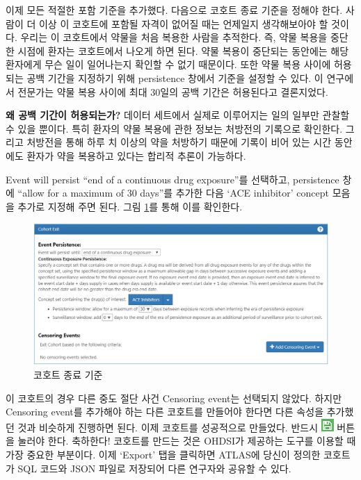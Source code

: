 \documentclass[10.5pt]{book}
\theoremstyle{definition}
\theoremstyle{definition}
\theoremstyle{definition}
\theoremstyle{remark}
\begin{document}
이제 모든 적절한 포함 기준을 추가했다. 다음으로 코호트 종료 기준을
정해야 한다. 사람이 더 이상 이 코호트에 포함될 자격이 없어질 때는
언제일지 생각해보아야 할 것이다. 우리는 이 코호트에서 약물을 처음 복용한
사람을 추적한다. 즉, 약물 복용을 중단한 시점에 환자는 코호트에서 나오게
하면 된다. 약물 복용이 중단되는 동안에는 해당 환자에게 무슨 일이
일어나는지 확인할 수 없기 때문이다. 또한 약물 복용 사이에 허용되는 공백
기간을 지정하기 위해 persistence 창에서 기준을 설정할 수 있다. 이
연구에서 전문가는 약물 복용 사이에 최대 30일의 공백 기간은 허용된다고
결론지었다.

\textbf{왜 공백 기간이 허용되는가?} 데이터 세트에서 실제로 이루어지는
일의 일부만 관찰할 수 있을 뿐이다. 특히 환자의 약물 복용에 관한 정보는
처방전의 기록으로 확인한다. 그리고 처방전을 통해 하루 치 이상의 약을
처방하기 때문에 기록이 비어 있는 시간 동안에도 환자가 약을 복용하고
있다는 합리적 추론이 가능하다.

Event will persist ``end of a continuous drug exposure''를 선택하고,
persistence 창에 ``allow for a maximum of 30 days''를 추가한 다음 `ACE
inhibitor' concept 모음을 추가로 지정해 주면 된다. 그림
\ref{fig:ATLAScohortexit}를 통해 이를 확인한다.

\begin{figure}

{\centering \includegraphics[width=1\linewidth]{images/Cohorts/cohort-exit} 

}

\caption{코호트 종료 기준}\label{fig:ATLAScohortexit}
\end{figure}

이 코호트의 경우 다른 중도 절단 사건 Censoring event는 선택되지 않았다.
하지만 Censoring event를 추가해야 하는 다른 코호트를 만들어야 한다면
다른 속성을 추가했던 것과 비슷하게 진행하면 된다. 이제 코호트를
성공적으로 만들었다. 반드시 \includegraphics{images/Cohorts/save.png}
버튼을 눌러야 한다. 축하한다! 코호트를 만드는 것은 OHDSI가 제공하는
도구를 이용할 때 가장 중요한 부분이다. 이제 `Export' 탭을 클릭하면
ATLAS에 당신이 정의한 코호트가 SQL 코드와 JSON 파일로 저장되어 다른
연구자와 공유할 수 있다.
\end{document}
